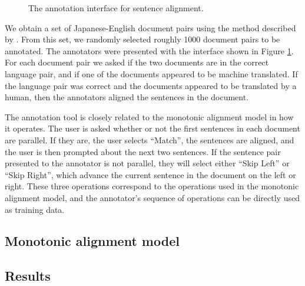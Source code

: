 \begin{figure}
\begin{center}
\caption{The annotation interface for sentence alignment.
}
\label{fig:google_annotate}
\end{center}
\end{figure}

We obtain a set of Japanese-English document pairs using the method described by
\citet{Uszkoreit10}. From this set, we randomly selected roughly 1000 document
pairs to be annotated. The annotators were presented with the interface shown in
Figure \ref{fig:google_annotate}. For each document pair we asked if
the two documents are in the correct language pair, and if one of the documents
appeared to be machine translated. If the language pair was correct and the
documents appeared to be translated by a human, then the annotators aligned the
sentences in the document.

The annotation tool is closely related to the monotonic alignment model in how
it operates. The user is asked whether or not the first sentences in each
document are parallel. If they are, the user selects ``Match'', the sentences
are aligned, and the user is then prompted about the next two sentences. If the
sentence pair presented to the annotator is not parallel, they will select
either ``Skip Left'' or ``Skip Right'', which advance the current sentence in
the document on the left or right. These three operations correspond to the
operations used in the monotonic alignment model, and the annotator's sequence
of operations can be directly used as training data.


\subsection{Monotonic alignment model}
\subsection{Results}
